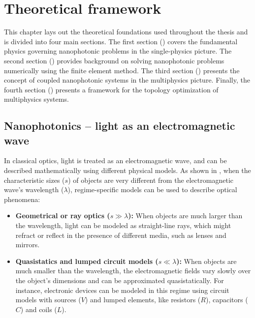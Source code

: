\chapter{Theoretical framework}

This chapter lays out the theoretical foundations used throughout the thesis and is divided into four main sections. The first section () covers the fundamental physics governing nanophotonic problems in the single-physics picture. The second section () provides background on solving nanophotonic problems numerically using the finite element method. The third section () presents the concept of coupled nanophotonic systems in the multiphysics picture. Finally, the fourth section () presents a framework for the topology optimization of multiphysics systems.




\section{Nanophotonics -- light as an electromagnetic
  wave}\label{sec:nanophotonics}

  In classical optics, light is treated as an electromagnetic wave, and can be described mathematically 
  using different physical models. As shown in ,
  when the characteristic sizes ($s$) of objects are very different from the electromagnetic wave's
  wavelength ($\lambda$),
  regime-specific models can be used to describe optical phenomena:
  \begin{itemize}
      \item \textbf{Geometrical or ray optics ($s \gg \lambda$):} When objects
   are much larger than the wavelength, light can be modeled as straight-line rays,
   which might refract or reflect in the presence of different media, such as
   lenses and mirrors.
      \item \textbf{Quasistatics and lumped circuit models ($s \ll \lambda$):}
   When objects are much smaller than the wavelength, the electromagnetic fields vary slowly over the object's dimensions 
   and can be approximated quasistatically. For instance, electronic devices
   can be modeled in this regime using circuit models with sources ($V$) and lumped elements, 
   like resistors ($R$), capacitors ($C$) and coils ($L$).
  \end{itemize}

